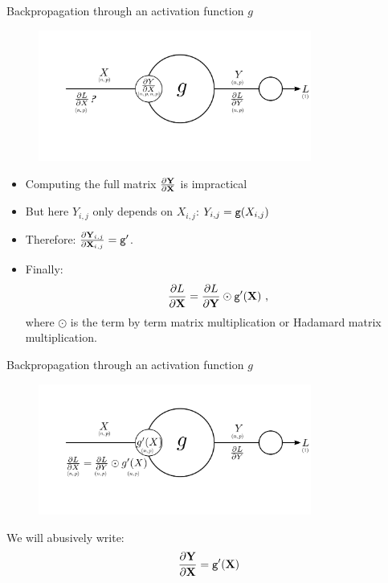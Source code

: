 \documentclass[xcolor=pdftex,dvipsnames,table,mathserif]{beamer}
\begin{document}
\begin{frame}{Backpropagation through an activation function $g$}

  \begin{figure}
    \centering
    \includegraphics[width=0.8\textwidth]{bp_activation.png}
  \end{figure}

  \vspace{-2em}

  \pause

  \begin{itemize}[<+->]
  \item Computing the full matrix $\pdv{\mathbf{Y}}{\mathbf{X}}$ is impractical
  \item But here $Y_{i,j}$ only depends on $X_{i,j}$: $Y_{i,j} = \texttt{g}(X_{i,j})$
  \item Therefore: $\pdv{\mathbf{Y}_{i,j}}{\mathbf{X}_{i,j}} = \texttt{g}'$.
  \item Finally:
    \[
    \pdv{L}{\mathbf{X}} = \pdv{L}{\mathbf{Y}} \odot \texttt{g}'(\mathbf{X}) \text{  ,}
    \]
    where $\odot$ is the term by term matrix multiplication or Hadamard matrix multiplication.
  \end{itemize}

\end{frame}


\begin{frame}{Backpropagation through an activation function $g$}

  \begin{figure}
    \centering
    \includegraphics[width=0.8\textwidth]{bp_activation_2.png}
  \end{figure}

  \begin{block}{}
    We will abusively write:
    \[
    \pdv{\mathbf{Y}}{\mathbf{X}} = \texttt{g}'(\mathbf{X})
    \]
  \end{block}

\end{frame}
\end{document}
